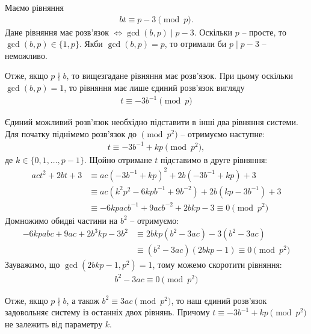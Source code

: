 \documentclass{thesis}
\begin{document}
Маємо рівняння
\begin{align*}
bt \equiv p-3 \pmod p.
\end{align*}
Дане рівняння має розв'язок $\iff \gcd(b,p) \mid p-3$. Оскільки $p$ -- просте, то $\gcd(b,p) \in \{1,p\}$. Якби $\gcd(b,p) = p$, то отримали би $p \mid p-3$ -- неможливо.

Отже, якщо $p \nmid b$, то вищезгадане рівняння має розв'язок. При цьому оскільки $\gcd(b,p) = 1$, то рівняння має лише єдиний розв'язок вигляду
\begin{align*}
t \equiv -3b^{-1} \pmod p
\end{align*}

Єдиний можливий розв'язок необхідно підставити в інші два рівняння системи. Для початку піднімемо розв'язок до $\pmod {p^2}$ -- отримуємо наступне:
\begin{align*}
t \equiv -3b^{-1} + kp \pmod {p^2},
\end{align*}
де $k \in \{0,1,\dots,p-1\}$. Щойно отримане $t$ підставимо в друге рівняння:
\begin{align*}
act^2 + 2bt + 3 & \equiv ac(-3b^{-1} + kp)^2 + 2b(-3b^{-1}+kp) + 3 \\
& \equiv ac(k^2p^2 - 6kpb^{-1} + 9b^{-2}) + 2b(kp - 3b^{-1}) + 3 \\
& \equiv -6kp acb^{-1} + 9 acb^{-2} + 2bkp - 3 \equiv 0 \pmod {p^2}
\end{align*}
Домножимо обидві частини на $b^2$ -- отримуємо:
\begin{align*}
-6kpabc + 9ac + 2b^3kp - 3b^2 & \equiv 2bkp(b^2 - 3ac) - 3(b^2 - 3ac) \\
& \equiv (b^2 - 3ac)(2bkp -1) \equiv 0 \pmod {p^2}
\end{align*}
Зауважимо, що $\gcd(2bkp-1, p^2) = 1$, тому можемо скоротити рівняння:
\begin{align*}
b^2 - 3 ac \equiv 0 \pmod {p^2}
\end{align*}

Отже, якщо $p \nmid b$, а також $b^2 \equiv 3ac \pmod {p^2}$, то наш єдиний розв'язок задовольняє систему із останніх двох рівнянь. Причому $t \equiv -3b^{-1} + kp \pmod {p^2}$ не залежить від параметру $k$.
\end{document}
